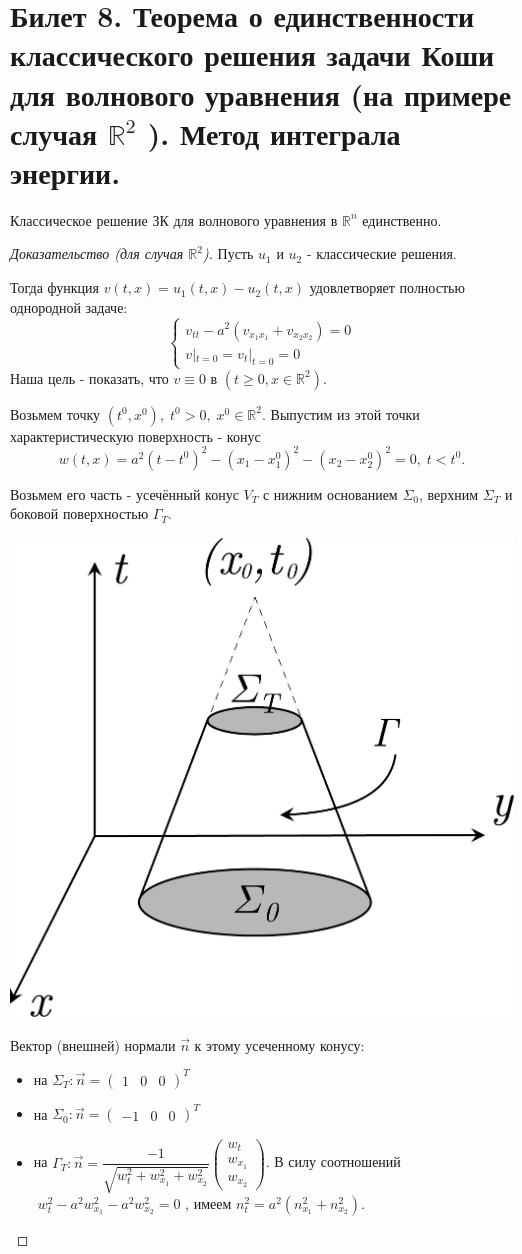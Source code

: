 \documentclass[../main.tex]{subfiles}
\begin{document}
\section{Билет 8. Теорема о единственности классического решения задачи Коши для волнового уравнения (на примере случая $\mathbb{R}^2$ ). Метод интеграла энергии.}


\begin{theorem} Классическое решение ЗК для волнового уравнения в $\mathbb{R}^n$ единственно.
\end{theorem}
\begin{proof}[Доказательство (для случая $\mathbb{R}^2$)]
Пусть $u_{1}$ и $u_{2}$ - классические решения.

Тогда функция $v(t,x) = u_{1}(t,x) - u_{2}(t,x)$ удовлетворяет полностью однородной задаче: 
\begin{equation*}
    \left\{
        \begin{matrix}
        v_{tt} - a^2(v_{x_1x_1} + v_{x_2x_2}) = 0\\
        v|_{t=0} = v_{t}|_{t=0} = 0
        \end{matrix}
    \right.
\end{equation*}
Наша цель - показать, что $v\equiv 0 $ в $ (t\geq 0, x\in \mathbb{R}^2) $.

Возьмем точку $ (t^0,x^0),\; t^0> 0,\; x^0\in\mathbb{R}^2 $. \; Выпустим из этой точки характеристическую поверхность - конус 
$$ 
w(t,x) = a^2(t - t^0)^2 - (x_1 - x_1^0)^2 - (x_2 - x_2^0)^2 = 0,\; t<t^0.
$$

Возьмем его часть - усечённый конус $ V_T $ с нижним основанием $ \Sigma_0 $, верхним $ \Sigma_T $  и боковой поверхностью $ \Gamma_T. $
\begin{center}
\includegraphics[width=0.28\linewidth]{pic 8.pdf}
\end{center}
Вектор (внешней) нормали $ \overrightarrow{n} $ к этому усеченному конусу:
\begin{itemize}
	\item на $\Sigma_T: \overrightarrow{n} = \begin{pmatrix}1 & 0 & 0\end{pmatrix}^T $
	\item на $\Sigma_0: \overrightarrow{n} = \begin{pmatrix}-1 & 0 & 0\end{pmatrix}^T $
	\item на $\Gamma_T:\overrightarrow{n}=\dfrac{-1}{\sqrt{w_t^2+w^2_{x_1}+w^2_{x_2}}}\begin{pmatrix}w_t\\w_{x_1}\\w_{x_2}\end{pmatrix}$. \; В силу соотношений $\; w_t^2 - a^2w^2_{x_1} - a^2w^2_{x_2} = 0 $ , имеем $n^2_t = a^2(n^2_{x_1} + n^2_{x_2})$.


\end{itemize}
\end{proof}
\end{document}
